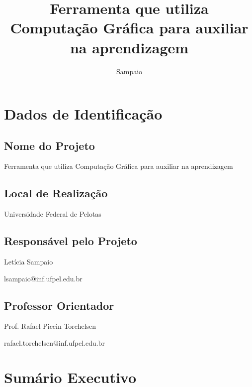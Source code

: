 \documentclass[tcc-proposta]{texufpel}
\title{Ferramenta que utiliza Computação Gráfica para auxiliar na aprendizagem}
\author{Sampaio}{Letícia}
\begin{document}

\maketitle 
\sloppy

\chapter{Dados de Identificação}

\section{Nome do Projeto}
Ferramenta que utiliza Computação Gráfica para auxiliar na aprendizagem

\section{Local de Realização}
Universidade Federal de Pelotas

\section{Responsável pelo Projeto}
Letícia Sampaio

lsampaio@inf.ufpel.edu.br

\section{Professor Orientador}
Prof. Rafael Piccin Torchelsen

rafael.torchelsen@inf.ufpel.edu.br


\chapter{Sumário Executivo}

\end{document}
